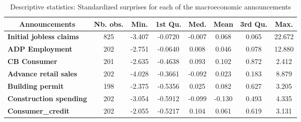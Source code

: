 \begin{landscape}
\begin{table}[]
\begin{center}
\caption{Descriptive statistics: Standardized surprises for each of the macroeconomic announcements}
\label{tab:stat2}
\begin{tabular}{@{}lccccccc@{}}
\toprule
\multicolumn{1}{c}{\textbf{Announcements}} & \textbf{Nb. obs.} & \textbf{Min.} & \textbf{1st Qu.} & \textbf{Med.} & \textbf{Mean} & \textbf{3rd Qu.} & \textbf{Max.} \\ \midrule
\textbf{Initial jobless claims}   & 825                               & -3.407                            & -0.0720                              & -0.007                   & 0.068                    & 0.065                       & 22.672                   \\
\textbf{ADP Employment}           & 202                               & -2.751                            & -0.0640                              & 0.008                    & 0.046                    & 0.078                       & 12.880                   \\
\textbf{CB Consumer}              & 201                               & -2.635                            & -0.4638                              & 0.093                    & 0.102                    & 0.872                       & 2.412                    \\
\textbf{Advance retail sales}     & 202                               & -4.028                            & -0.3661                              & -0.092                   & 0.023                    & 0.183                       & 8.879                    \\
\textbf{Building permit}          & 198                               & -2.375                            & -0.5356                              & 0.025                    & 0.082                    & 0.627                       & 3.205                    \\
\textbf{Construction spending}    & 202                               & -3.054                            & -0.5912                              & -0.099                   & -0.130                   & 0.493                       & 4.335                    \\
\textbf{Consumer\_credit}         & 202                               & -2.055                            & -0.5217                              & 0.104                    & 0.061                    & 0.619                       & 3.131                    \\

\end{tabular}
\end{center}
\end{table}
\end{landscape}
